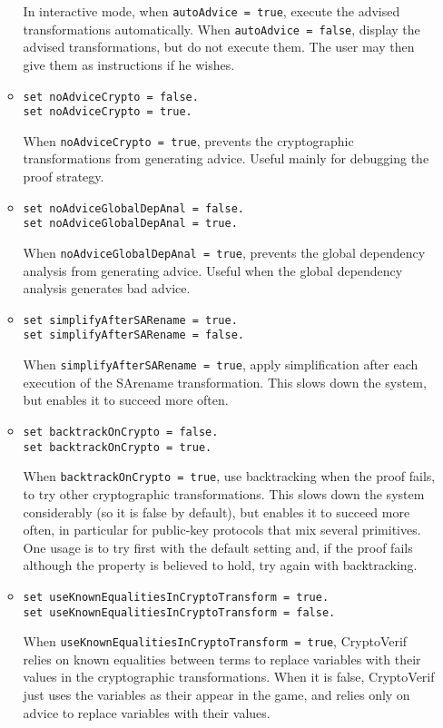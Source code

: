 \begin{itemize}
\begin{itemize}
In interactive mode, when \texttt{autoAdvice = true}, execute the
advised transformations automatically. When \texttt{autoAdvice = false},
display the advised transformations, but do not execute them.
The user may then give them as instructions if he wishes.

\item \texttt{set noAdviceCrypto = false.}\\
\texttt{set noAdviceCrypto = true.}

When \texttt{noAdviceCrypto = true}, prevents the cryptographic 
transformations from generating advice. Useful mainly for debugging
the proof strategy.

\item \texttt{set noAdviceGlobalDepAnal = false.}\\
\texttt{set noAdviceGlobalDepAnal = true.}

When \texttt{noAdviceGlobalDepAnal = true}, prevents the global
dependency analysis from generating advice. Useful when the global
dependency analysis generates bad advice.

\item \texttt{set simplifyAfterSARename = true.}\\
\texttt{set simplifyAfterSARename = false.}

When \texttt{simplifyAfterSARename = true}, apply simplification after
each execution of the SArename transformation. This slows down
the system, but enables it to succeed more often.

\item \texttt{set backtrackOnCrypto = false.}\\
\texttt{set backtrackOnCrypto = true.}

When \texttt{backtrackOnCrypto = true}, use backtracking when the proof
fails, to try other cryptographic transformations. This slows down
the system considerably (so it is false by default), but enables
it to succeed more often, in particular for public-key protocols
that mix several primitives. One usage is to try first with the default
setting and, if the proof fails although the property
is believed to hold, try again with backtracking.

\item \texttt{set useKnownEqualitiesInCryptoTransform = true.}\\
\texttt{set useKnownEqualitiesInCryptoTransform = false.}

When \texttt{useKnownEqualitiesInCryptoTransform = true}, CryptoVerif
relies on known equalities between terms to replace variables with
their values in the cryptographic transformations.
When it is false, CryptoVerif just uses the variables as their
appear in the game, and relies only on advice to replace variables
with their values. 


\end{itemize}
\end{itemize}
